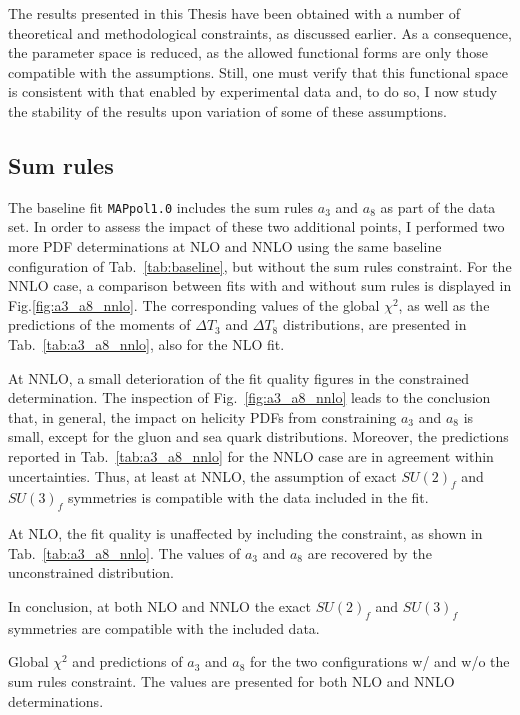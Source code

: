 The results presented in this Thesis have been obtained with a number of theoretical and methodological constraints, as discussed earlier. As a consequence, the parameter space is reduced, as the allowed functional forms are only those compatible with the assumptions. Still, one must verify that this functional space is consistent with that enabled by experimental data and, to do so, I now study the stability of the results upon variation of some of these assumptions.

\subsection*{Sum rules}

The baseline fit \texttt{MAPpol1.0} includes the sum rules $a_3$ and $a_8$ as part of the data set. In order to assess the impact of these two additional points, I performed two more PDF determinations at NLO and NNLO using the same baseline configuration of Tab.~\ref{tab:baseline}, but without the sum rules constraint. For the NNLO case, a comparison between fits with and without sum rules is displayed in Fig.\ref{fig:a3_a8_nnlo}. The corresponding values of the global $\chi^2$, as well as the predictions of the moments of $\Delta T_3$ and $\Delta T_8$ distributions, are presented in Tab.~\ref{tab:a3_a8_nnlo}, also for the NLO fit.%

At NNLO, a small deterioration of the fit quality figures in the constrained determination. The inspection of Fig.~\ref{fig:a3_a8_nnlo} leads to the conclusion that, in general, the impact on helicity PDFs from constraining $a_3$ and $a_8$ is small, except for the gluon and sea quark distributions. Moreover, the predictions reported in Tab.~\ref{tab:a3_a8_nnlo} for the NNLO case are in agreement within uncertainties. Thus, at least at NNLO, the assumption of exact $SU(2)_f$ and $SU(3)_f$ symmetries is compatible with the data included in the fit.%

At NLO, the fit quality is unaffected by including the constraint, as shown in Tab.~\ref{tab:a3_a8_nnlo}. The values of $a_3$ and $a_8$ are recovered by the unconstrained distribution.%

In conclusion, at both NLO and NNLO the exact $SU(2)_f$ and $SU(3)_f$ symmetries are compatible with the included data.

\begin{table}[t]
  \centering
  \small
  
  \caption{
    \small
    Global $\chi^2$ and predictions of $a_3$ and $a_8$ for the two configurations w/ and w/o the sum rules constraint. The values are presented for both NLO and NNLO determinations.
  \label{tab:a3_a8_nnlo}}
\end{table}

